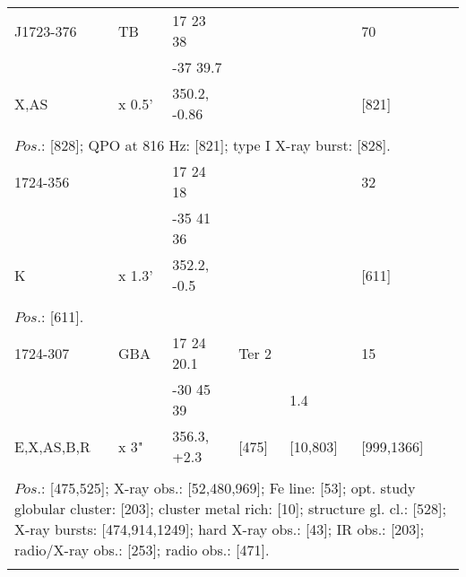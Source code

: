\documentclass{aa}
\begin{document}
\begin{tabular}{p{2.5cm}p{1cm}p{1.8cm}p{2.3cm}p{3.3cm}p{2.0cm}p{2.2cm}}
\noalign{\smallskip}
J1723-376      &  TB           & 17 23 38        &                    &           & 70                  &      \\
                         &                   & -37 39.7         &                    &           &                       &    \\
X,AS                & x 0.5'         & 350.2, -0.86   &                    &           & [821]             &    \\
\\
\multicolumn{7}{p{17.5cm}}{
$Pos$.: [828]; QPO at 816 Hz: [821]; type I X-ray burst: [828].}\\
\noalign{\smallskip}
\hline

\noalign{\smallskip}
1724-356        &                & 17 24 18           &                    &                        & 32                 &          \\
                         &                & -35 41 36          &                    &                        &                      &          \\
K                      & x 1.3'      & 352.2, -0.5        &                    &                        & [611]            &         \\
\\
\multicolumn{7}{p{17.5cm}}{
$Pos$.: [611].}\\
\noalign{\smallskip}
\hline

\noalign{\smallskip}
1724-307        & GBA          & 17 24 20.1           & Ter 2              &                           & 15                 &          \\
                         &                     & -30 45 39            &                         & 1.4                     &                      &         \\
E,X,AS,B,R    & x 3"            & 356.3, +2.3          & [475]              & [10,803]            & [999,1366]  &          \\
\\
\multicolumn{7}{p{17.5cm}}{
$Pos$.: [475,525]; X-ray obs.: [52,480,969]; Fe line: [53]; opt. study globular cluster: [203]; cluster metal rich: [10]; 
structure gl. cl.: [528]; X-ray bursts: [474,914,1249]; hard X-ray obs.: [43]; IR obs.: [203]; radio/X-ray obs.: [253]; 
radio obs.: [471].}\\
\noalign{\smallskip}
\hline


\end{tabular}
\end{document}
